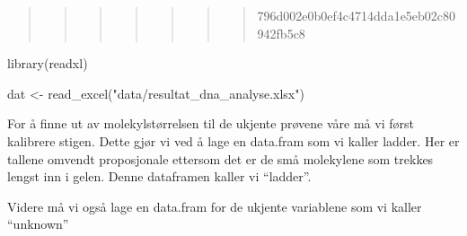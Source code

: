 \documentclass[
  letterpaper,
  DIV=11,
  numbers=noendperiod]{scrartcl}
\newenvironment{Shaded}{\begin{snugshade}}{\end{snugshade}}
\newcommand{\FunctionTok}[1]{\textcolor[rgb]{0.28,0.35,0.67}{#1}}
\newcommand{\NormalTok}[1]{\textcolor[rgb]{0.00,0.23,0.31}{#1}}
\newcommand{\OtherTok}[1]{\textcolor[rgb]{0.00,0.23,0.31}{#1}}
\newcommand{\StringTok}[1]{\textcolor[rgb]{0.13,0.47,0.30}{#1}}
\begin{document}
\begin{quote}
\begin{quote}
\begin{quote}
\begin{quote}
\begin{quote}
\begin{quote}
\begin{quote}
796d002e0b0ef4c4714dda1e5eb02c80942fb5c8
\end{quote}
\end{quote}
\end{quote}
\end{quote}
\end{quote}
\end{quote}
\end{quote}

\begin{Shaded}
\begin{Highlighting}[]
\FunctionTok{library}\NormalTok{(readxl)}

\NormalTok{dat }\OtherTok{\textless{}{-}} \FunctionTok{read\_excel}\NormalTok{(}\StringTok{"data/resultat\_dna\_analyse.xlsx"}\NormalTok{)}
\end{Highlighting}
\end{Shaded}

For å finne ut av molekylstørrelsen til de ukjente prøvene våre må vi
først kalibrere stigen. Dette gjør vi ved å lage en data.fram som vi
kaller ladder. Her er tallene omvendt proposjonale ettersom det er de
små molekylene som trekkes lengst inn i gelen. Denne dataframen kaller
vi ``ladder''.

Videre må vi også lage en data.fram for de ukjente variablene som vi
kaller ``unknown''
\end{document}
